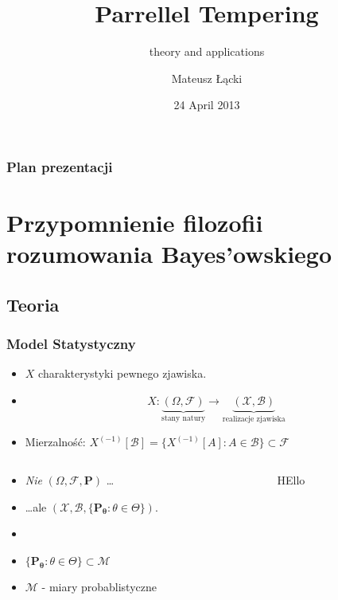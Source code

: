 \documentclass[xetex]{beamer}
\title[Parrellel Tempering]{Parrellel Tempering }
\subtitle{theory and applications}
\date{24 April 2013}
\author[Łącki]{Mateusz Łącki}
\institute[UW]{Uniwersytet Warszawski}
\begin{document}


\begin{frame}
\titlepage
\end{frame}

\begin{frame}
	\frametitle{Plan prezentacji}
	\tableofcontents[pausesections]
\end{frame}



\section[Bayes]{Przypomnienie filozofii rozumowania Bayes'owskiego}

\subsection{Teoria}

\begin{frame}
	\frametitle{Model Statystyczny}
	
\begin{itemize}
	\item $X $ charakterystyki pewnego zjawiska.
	\item $$X: \underbrace{(\Omega, \mathcal{F})}_{\text{stany natury}}\rightarrow \underbrace{(\mathcal{X}, \mathcal{B})}_{\text{realizacje zjawiska}} $$
	\item Mierzalność: $ X^{(-1)} [ \mathcal{B}] = \{ X^{(-1)} [A] : A \in \mathcal{B} \} \subset \mathcal{F}$
\end{itemize} 	


\begin{columns}
\begin{column}[t]{5cm}
	\begin{itemize}
		\item \emph{Nie} $( \Omega, \mathcal{F}, \mathbf{P} )$ \dots
		\item \dots ale $( \mathcal{X}, \mathcal{B}, \{\mathbf{P_\theta} : \theta \in \Theta\} )$.
		\item
		\item $\{\mathbf{P_\theta} : \theta \in \Theta\} \subset \mathcal{M} $
		\item $\mathcal{M}$ - miary probablistyczne
	\end{itemize}
\end{column}
\begin{column}[t]{5cm}
	\begin{center}
		HEllo	
	\end{center}		
\end{column}
\end{columns}
		
\end{frame}
\end{document}
